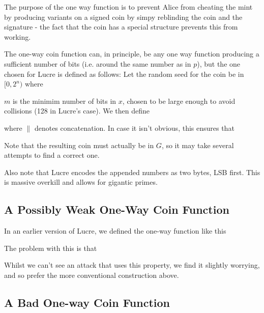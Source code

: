 \documentclass[a4paper,titlepage]{article}
\begin{document}
The purpose of the one way function is to prevent Alice from cheating
the mint by producing variants on a signed coin by simpy reblinding
the coin and the signature - the fact that the coin has a special
structure prevents this from working.

The one-way coin function can, in principle, be any one way function
producing a sufficient number of bits (i.e. around the same number as
in $p$), but the one chosen for Lucre is defined as follows: Let the
random seed for the coin be in $[0,2^n)$ where


$m$ is the minimim number of bits in $x$, chosen to be large
enough to avoid collisions (128 in Lucre's case). We then define


where $\|$ denotes concatenation. In case it isn't obvious, this
ensures that


Note that the resulting coin must actually be in $G$, so it may take
several attempts to find a correct one.

Also note that Lucre encodes the appended numbers as two bytes, LSB
first. This is massive overkill and allows for gigantic primes.

\subsection{A Possibly Weak One-Way Coin Function}

In an earlier version of Lucre, we defined the one-way function like
this



The problem with this is that


Whilst we can't see an attack that uses this property, we find it
slightly worrying, and so prefer the more conventional construction above.

\subsection{A Bad One-way Coin Function}
\label{sec:badoneway}
\end{document}
